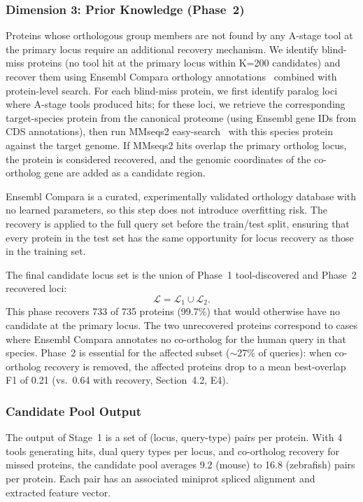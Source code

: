 \subsubsection{Dimension 3: Prior Knowledge (Phase~2)}

Proteins whose orthologous group members are not found by any A-stage tool at the primary locus require an additional recovery mechanism. We identify blind-miss proteins (no tool hit at the primary locus within K=200 candidates) and recover them using Ensembl Compara orthology annotations~\cite{herrero2016ensembl} combined with protein-level search. For each blind-miss protein, we first identify paralog loci where A-stage tools produced hits; for these loci, we retrieve the corresponding target-species protein from the canonical proteome (using Ensembl gene IDs from CDS annotations), then run MMseqs2 easy-search~\cite{steinegger2017mmseqs2} with this species protein against the target genome. If MMseqs2 hits overlap the primary ortholog locus, the protein is considered recovered, and the genomic coordinates of the co-ortholog gene are added as a candidate region.

Ensembl Compara is a curated, experimentally validated orthology database with no learned parameters, so this step does not introduce overfitting risk. The recovery is applied to the full query set before the train/test split, ensuring that every protein in the test set has the same opportunity for locus recovery as those in the training set.

The final candidate locus set is the union of Phase~1 tool-discovered and Phase~2 recovered loci:
\begin{equation}
\mathcal{L} = \mathcal{L}_{1} \cup \mathcal{L}_{2}.
\label{eq:locus_union}
\end{equation}
This phase recovers 733 of 735 proteins (99.7\%) that would otherwise have no candidate at the primary locus. The two unrecovered proteins correspond to cases where Ensembl Compara annotates no co-ortholog for the human query in that species. Phase~2 is essential for the affected subset ($\sim$27\% of queries): when co-ortholog recovery is removed, the affected proteins drop to a mean best-overlap F1 of 0.21 (vs.\ 0.64 with recovery, Section~4.2, E4).

\subsubsection{Candidate Pool Output}

The output of Stage~1 is a set of (locus, query-type) pairs per protein. With 4 tools generating hits, dual query types per locus, and co-ortholog recovery for missed proteins, the candidate pool averages 9.2 (mouse) to 16.8 (zebrafish) pairs per protein. Each pair has an associated miniprot spliced alignment and extracted feature vector.

